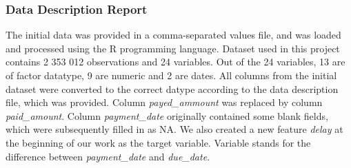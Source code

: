 \documentclass[
]{article}
\begin{document}
\hypertarget{data-description-report}{%
\subsubsection{Data Description Report}\label{data-description-report}}

The initial data was provided in a comma-separated values file, and was loaded and processed using the R programming language. Dataset used in this project contains 2 353 012 observations and 24 variables. Out of the 24 variables, 13 are of factor datatype, 9 are numeric and 2 are dates. All columns from the initial dataset were converted to the correct datype according to the data description file, which was provided. Column \emph{payed\_ammount} was replaced by column \emph{paid\_amount}. Column \emph{payment\_date} originally contained some blank fields, which were subsequently filled in as NA.
We also created a new feature \emph{delay} at the beginning of our work as the target variable. Variable stands for the difference between \emph{payment\_date} and \emph{due\_date}.
\end{document}
